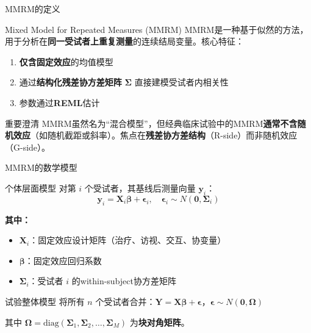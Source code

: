 \documentclass[aspectratio=169,11pt]{beamer}
\newcommand{\bY}{\mathbf{Y}}
\newcommand{\by}{\mathbf{y}}
\newcommand{\bX}{\mathbf{X}}
\newcommand{\bbeta}{\boldsymbol{\beta}}
\newcommand{\bepsilon}{\boldsymbol{\epsilon}}
\newcommand{\bSigma}{\boldsymbol{\Sigma}}
\newcommand{\bOmega}{\boldsymbol{\Omega}}
\newcommand{\diag}{\mathrm{diag}}
\begin{document}
\begin{frame}{MMRM的定义}
\begin{block}{Mixed Model for Repeated Measures (MMRM)}
MMRM是一种基于似然的方法，用于分析在\textbf{同一受试者上重复测量}的连续结局变量。核心特征：
\begin{enumerate}
    \item \textbf{仅含固定效应}的均值模型
    \item 通过\textbf{结构化残差协方差矩阵} $\bSigma$ 直接建模受试者内相关性
    \item 参数通过\textbf{REML}估计
\end{enumerate}
\end{block}

\vspace{0.2cm}
\begin{alertblock}{重要澄清}
MMRM虽然名为``混合模型''，但经典临床试验中的MMRM\textbf{通常不含随机效应}（如随机截距或斜率）。焦点在\textbf{残差协方差结构}（R-side）而非随机效应（G-side）。
\end{alertblock}
\end{frame}

\begin{frame}{MMRM的数学模型}
\begin{block}{个体层面模型}
对第 $i$ 个受试者，其基线后测量向量 $\by_i$：
\[
\by_i = \bX_i \bbeta + \bepsilon_i, \quad \bepsilon_i \sim N(\mathbf{0}, \bSigma_i)
\]
\end{block}

\vspace{-0.1cm}
\textbf{其中：}
\begin{itemize}
    \item $\bX_i$：固定效应设计矩阵（治疗、访视、交互、协变量）
    \item $\bbeta$：固定效应回归系数
    \item $\bSigma_i$：受试者 $i$ 的within-subject协方差矩阵
\end{itemize}

\vspace{0.1cm}
\begin{block}{试验整体模型}
将所有 $n$ 个受试者合并：$\bY = \bX \bbeta + \bepsilon$，\quad $\bepsilon \sim N(\mathbf{0}, \bOmega)$

其中 $\bOmega = \diag(\bSigma_1, \bSigma_2, \dots, \bSigma_M)$ 为\textbf{块对角矩阵}。
\end{block}
\end{frame}
\end{document}
